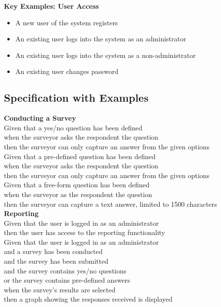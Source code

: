 \documentclass[12pt]{witseiepaper}
\begin{document}
\textbf{Key Examples: User Access}
\begin{itemize}
\item A new user of the system registers
\item An existing user logs into the system as an administrator
\item An existing user logs into the system as a non-administrator
\item An existing user changes password
\end{itemize}


\subsection{Specification with Examples}

\textbf{Conducting a Survey}\\
Given that a yes/no question has been defined \\
when the surveyor asks the respondent the question\\
then the surveyor can only capture an answer from the given options\\

Given that a pre-defined question has been defined\\
when the surveyor asks the respondent the question\\
then the surveyor can only capture an answer from the given options\\

Given that a free-form question has been defined\\
when the surveyor as the respondent the question\\
then the surveyor can capture a text answer, limited to 1500 characters\\

\textbf{Reporting}\\
Given that the user is logged in as an administrator\\
then the user has access to the reporting functionality\\

Given that the user is logged in as an administrator\\
and a survey has been conducted\\
and the survey has been submitted\\
and the survey contains yes/no questions\\
or the survey contains pre-defined answers\\
when the survey’s results are selected\\
then a graph showing the responses received is displayed\\
\end{document}
